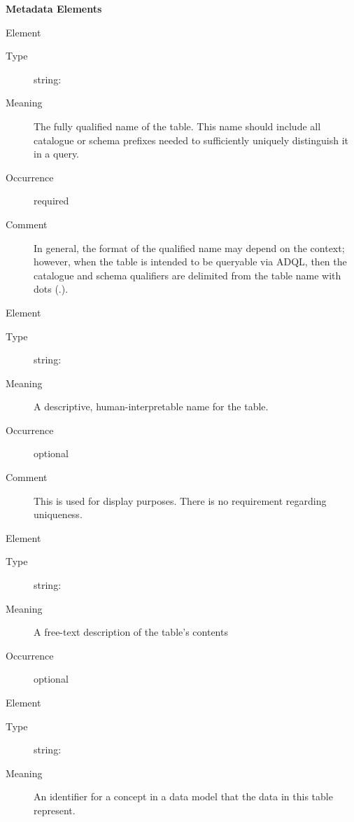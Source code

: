 \documentclass[11pt,a4paper]{ivoa}
\begin{document}
\begin{generated}
\vspace{0.5ex}\noindent\textbf{ Metadata Elements}

\begingroup\small\begin{bigdescription}\item[Element \xmlel{name}]
\begin{description}
\item[Type] string: 
\item[Meaning]
                  The fully qualified name of the table.  This name
                  should include all catalogue or schema prefixes
                  needed to sufficiently uniquely distinguish it in a
                  query.

\item[Occurrence] required
\item[Comment]
                  In general, the format of the qualified name may
                  depend on the context; however, when the
                  table is intended to be queryable via ADQL, then the
                  catalogue and schema qualifiers are delimited from the
                  table name with dots (.).


\end{description}
\item[Element \xmlel{title}]
\begin{description}
\item[Type] string: 
\item[Meaning]
                  A descriptive, human-interpretable name for the table.

\item[Occurrence] optional
\item[Comment]
                  This is used for display purposes.  There is no requirement
                  regarding uniqueness.


\end{description}
\item[Element \xmlel{description}]
\begin{description}
\item[Type] string: 
\item[Meaning]
                  A free-text description of the table's contents

\item[Occurrence] optional

\end{description}
\item[Element \xmlel{utype}]
\begin{description}
\item[Type] string: 
\item[Meaning]
                  An identifier for a concept in a data model that
                  the data in this table represent.


\end{description}
\end{bigdescription}
\end{generated}
\end{document}
